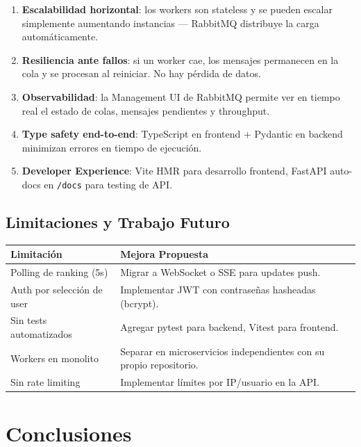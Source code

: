\documentclass[12pt,a4paper]{article}
\newcommand{\code}[1]{\texttt{\small\color{navy}#1}}
\begin{document}
\begin{enumerate}
  \item \textbf{Escalabilidad horizontal}: los workers son stateless y se pueden escalar
        simplemente aumentando instancias — RabbitMQ distribuye la carga automáticamente.
  \item \textbf{Resiliencia ante fallos}: si un worker cae, los mensajes permanecen en la
        cola y se procesan al reiniciar. No hay pérdida de datos.
  \item \textbf{Observabilidad}: la Management UI de RabbitMQ permite ver en tiempo real
        el estado de colas, mensajes pendientes y throughput.
  \item \textbf{Type safety end-to-end}: TypeScript en frontend + Pydantic en backend
        minimizan errores en tiempo de ejecución.
  \item \textbf{Developer Experience}: Vite HMR para desarrollo frontend, FastAPI auto-docs
        en \code{/docs} para testing de API.
\end{enumerate}

\subsection{Limitaciones y Trabajo Futuro}

\begin{tabularx}{\linewidth}{@{}lX@{}}
  \toprule
  \textbf{Limitación} & \textbf{Mejora Propuesta} \\
  \midrule
  Polling de ranking (5s)  & Migrar a WebSocket o SSE para updates push. \\
  Auth por selección de user & Implementar JWT con contraseñas hasheadas (bcrypt). \\
  Sin tests automatizados  & Agregar pytest para backend, Vitest para frontend. \\
  Workers en monolito      & Separar en microservicios independientes con su propio repositorio. \\
  Sin rate limiting        & Implementar límites por IP/usuario en la API. \\
  \bottomrule
\end{tabularx}

\section{Conclusiones}
\end{document}
